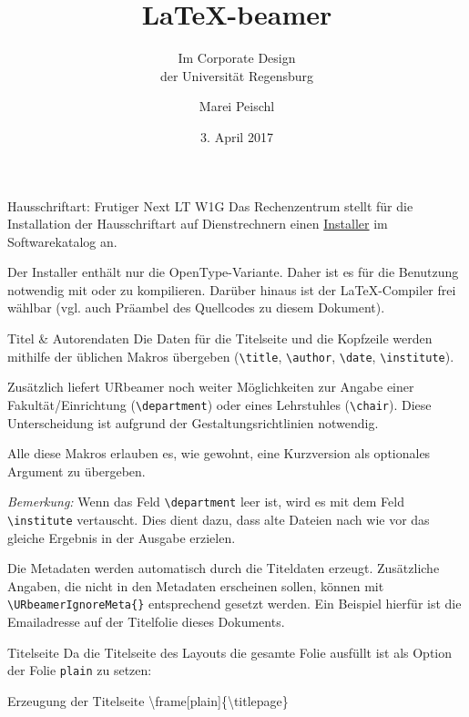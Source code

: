 \documentclass[english,%
	aspectratio=169,%
	colors={rz,faculties},%
	framenumber=true,%
	externalize=true,
	]{URbeamer}
\title{\LaTeX-beamer}
\subtitle{Im Corporate Design\\\hspace*{\fill} der Universität Regensburg}
\date{3. April 2017}
\author[Marei Peischl]{Marei Peischl\URbeamerIgnoreMeta{ (\url{TeX@mareipeischl.de})}}%
\newcommand*\code[1]{\texttt{#1}}
\begin{document}
	
\frame[plain]{\titlepage}

\begin{frame}{Hausschriftart: Frutiger Next LT W1G}
	Das Rechenzentrum stellt für die Installation der Hausschriftart auf Dienstrechnern einen \href{http://www.uni-regensburg.de/rechenzentrum/software/softwarekatalog/produktdetails/index.html?product_hash=cc47a29792efce83538cdf5660de6f5d}{Installer} im Softwarekatalog an. 

	\medskip
	Der Installer enthält nur die OpenType-Variante. Daher ist es für die Benutzung notwendig mit  oder  zu kompilieren. Darüber hinaus ist der \LaTeX-Compiler frei wählbar (vgl. auch Präambel des Quellcodes zu diesem Dokument).
\end{frame}

\begin{frame}{Titel \& Autorendaten}
	Die Daten für die Titelseite und die Kopfzeile werden mithilfe der üblichen Makros übergeben (\code{\textbackslash{}title}, \code{\textbackslash{}author}, \code{\textbackslash{}date}, \code{\textbackslash{}institute}).
	
	\smallskip
	Zusätzlich liefert URbeamer noch weiter Möglichkeiten zur Angabe einer Fakultät/Einrichtung (\code{\textbackslash{}department}) oder eines Lehrstuhles (\code{\textbackslash{}chair}). Diese Unterscheidung ist aufgrund der Gestaltungsrichtlinien notwendig.

	\smallskip	
	Alle diese Makros erlauben es, wie gewohnt, eine Kurzversion als optionales Argument zu übergeben.
	
	\medskip
	\small
	\emph{Bemerkung:} Wenn das Feld \code{\textbackslash{}department} leer ist, wird es mit dem Feld \code{\textbackslash{}institute} vertauscht. Dies dient dazu, dass alte Dateien nach wie vor das gleiche Ergebnis in der Ausgabe erzielen.
	
	\smallskip
	\normalsize
	Die Metadaten werden automatisch durch die Titeldaten erzeugt. Zusätzliche Angaben, die nicht in den Metadaten erscheinen sollen, können mit \code{\textbackslash{}URbeamerIgnoreMeta\{\}} entsprechend gesetzt werden. Ein Beispiel hierfür ist die Emailadresse auf der Titelfolie dieses Dokuments.
\end{frame}

\begin{frame}{Titelseite}
	Da die Titelseite des Layouts die gesamte Folie ausfüllt ist als Option der Folie \code{plain} zu setzen:
	
	\begin{block}{Erzeugung der Titelseite}
	 \ttfamily\textbackslash{}frame[plain]\{\textbackslash{}titlepage\}
	 \end{block}
\end{frame}
\end{document}
